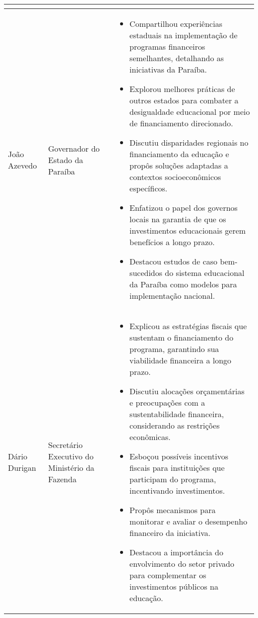 \documentclass[a4paper,10pt]{article}
\begin{document}
\begin{table}[htbp!]
\begin{tabular}{|p{1in}|p{1.4in}|p{4in}|}
\begin{itemize}
		\end{itemize}\\
		\hline
		João Azevedo & Governador do Estado da Paraíba & \begin{itemize}
			\item Compartilhou experiências estaduais na implementação de programas financeiros semelhantes, detalhando as iniciativas da Paraíba.
			\item Explorou melhores práticas de outros estados para combater a desigualdade educacional por meio de financiamento direcionado.
			\item Discutiu disparidades regionais no financiamento da educação e propôs soluções adaptadas a contextos socioeconômicos específicos.
			\item Enfatizou o papel dos governos locais na garantia de que os investimentos educacionais gerem benefícios a longo prazo.
			\item Destacou estudos de caso bem-sucedidos do sistema educacional da Paraíba como modelos para implementação nacional.
		\end{itemize}\\
		\hline
		Dário Durigan & Secretário Executivo do Ministério da Fazenda & \begin{itemize}
			\item Explicou as estratégias fiscais que sustentam o financiamento do programa, garantindo sua viabilidade financeira a longo prazo.
			\item Discutiu alocações orçamentárias e preocupações com a sustentabilidade financeira, considerando as restrições econômicas.
			\item Esboçou possíveis incentivos fiscais para instituições que participam do programa, incentivando investimentos.
			\item Propôs mecanismos para monitorar e avaliar o desempenho financeiro da iniciativa.
			\item Destacou a importância do envolvimento do setor privado para complementar os investimentos públicos na educação.
		\end{itemize}\\
		\hline
	\end{tabular}
\end{table}


\newpage
\end{document}
